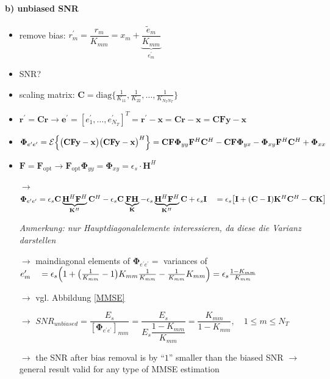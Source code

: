 \documentclass[a4paper, 10pt]{article}
\begin{document}
\paragraph*{b) unbiased SNR}
\label{unbiased_SNR}
\begin{itemize}
	\item remove bias: $r_m^\prime = \dfrac{r_m}{K_{mm}} = x_m + \underbrace{\dfrac{\tilde{e}_m}{K_{mm}}}_{e^\prime_m} $
	\item SNR?
	\item scaling matrix: $ \mathbf{C} = \text{diag}\bigl\{\frac{1}{K_{11}}, \frac{1}{K_{22}}, \dots, \frac{1}{K_{N_TN_T}}  \bigr\} $
	\item $\mathbf{r}^\prime = \mathbf{Cr} \rightarrow \mathbf{e}^\prime = [e^\prime_1, \dots, e^\prime_{N_T}]^T = \mathbf{r}^\prime - \mathbf{x}  = \mathbf{Cr} - \mathbf{x} = \mathbf{CFy} - \mathbf{x} $
	\item $\boldsymbol{\Phi}_{e^\prime e^\prime} = \mathcal{E}\Bigl\{\bigr(\mathbf{CFy} - \mathbf{x}\bigr)\bigl(\mathbf{CFy} - \mathbf{x}\bigr)^H\Bigr\} = \mathbf{CF}\boldsymbol{\Phi}_{yy}\mathbf{F}^H\mathbf{C}^H - \mathbf{CF}\boldsymbol{\Phi}_{yx} - \boldsymbol{\Phi}_{xy}\mathbf{F}^H\mathbf{C}^H + \boldsymbol{\Phi}_{xx}$
	\item $ \mathbf{F} = 	\mathbf{F}_{\text{opt}} \rightarrow \mathbf{F}_{\text{opt}}\boldsymbol{\Phi}_{yy} = \boldsymbol{\Phi}_{xy} = \epsilon_s\cdot\mathbf{H}^H $
	\item[$\rightarrow$] $\boldsymbol{\Phi}_{e^\prime e^\prime} = \epsilon_s\mathbf{C}\underbrace{\mathbf{H}^H\mathbf{F}^H}_{\mathbf{K}^H}\mathbf{C}^H - \epsilon_s\mathbf{C}\underbrace{\mathbf{FH}}_{\mathbf{K}} - \epsilon_s\underbrace{\mathbf{H}^H\mathbf{F}^H}_{\mathbf{K}^H}\mathbf{C}  + \epsilon_s\mathbf{I} \\ \quad = \epsilon_s\bigl[\mathbf{I} + (\mathbf{C} - \mathbf{I})\mathbf{K}^H\mathbf{C}^H - \mathbf{CK}\bigr]$  
	\item[] \textit{Anmerkung: nur Hauptdiagonalelemente interessieren, da diese die Varianz darstellen}
	\item[$\rightarrow$] maindiagonal elements of $\boldsymbol{\Phi}_{e^\prime e^\prime} =  $ variances of $ e^\prime _m \quad = \epsilon_s\Bigl ( 1 + \bigl (\frac{1}{K_{mm}} - 1\bigr )   K_{mm}\frac{1}{K_{mm}}  - \frac{1}{K_{mm}}  K_{mm}\Bigr )  = \epsilon_s\frac{1 - K_{mm}}{K_{mm}}$
	\item[$\rightarrow$] vgl. Abbildung \ref{MMSE}
	\item[$\rightarrow$]$SNR_{unbiased}=\dfrac{E_s}{[\boldsymbol{\Phi}_{e^\prime e^\prime}]_{mm}}=\dfrac{E_s}{E_s\dfrac{1-K_{mm}}{K_{mm}}}
	=\dfrac{K_{mm}}{1-K_{mm}}, \quad 1\leq m \leq N_T$
	\item[$\rightarrow$]the SNR after bias removal is by ``$1$'' smaller than the biased SNR $\rightarrow$ general result valid for any type of
	MMSE estimation
\end{itemize}
\end{document}
